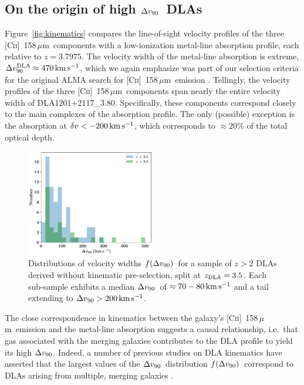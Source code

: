 \documentclass[twocolumn]{aastex62}
\newcommand{\zdla}{3.7975}
\newcommand{\dlaname}{DLA1201+2117\_3.80}
\newcommand{\cplus}{[\ctwo]~158\,$\mu$m}
\newcommand{\mdvninety}{\Delta v_{\rm 90}}
\newcommand{\dvninety}{$\mdvninety$}
\newcommand{\mfdv}{f(\mdvninety)}
\newcommand{\fdv}{$\mfdv$}
\newcommand{\mkms}{\rm km \, s^{-1}}
\newcommand{\ctwo}{C\textsc{ii}}
\begin{document}
\subsection{On the origin of high \dvninety\ DLAs}
\label{sec:high_dv}

Figure~\ref{fig:kinematics} compares the line-of-sight velocity profiles of the three 
\cplus\ components with a low-ionization metal-line absorption profile, each relative 
to $z = \zdla$. The velocity width of the metal-line absorption is extreme, 
$\mdvninety^{\rm DLA} \approx 470 \, \mkms$,  which we again emphasize was part of our selection
criteria for the original ALMA search for \cplus\ emission \citep{neeleman+17}. Tellingly, 
the velocity profiles of the three \cplus\ components span nearly the entire velocity 
width of \dlaname. Specifically, these components correspond closely to the main complexes
of the absorption profile. The only (possible) exception is the absorption at 
$\delta v < -200 \, \mkms$, which corresponds to $\approx 20\%$ of the total optical depth.

\begin{figure}
\centering
\includegraphics[width=0.5\textwidth]{fig_fdv.pdf}
\vspace{-0.3in}
\caption{Distributions of velocity widths \fdv\ for a sample of $z>2$ DLAs derived without 
kinematic pre-selection, split at $z_{\rm DLA} = 3.5$. Each sub-sample exhibits a median 
\dvninety\ of  $\approx 70-80 \, \mkms$ and a tail extending to $\mdvninety > 200 \, \mkms$.
}
\label{fig:fdv}
\end{figure}


The close correspondence in kinematics between the galaxy's \cplus\ emission and the 
metal-line absorption suggests a causal relationship, i.e.\ that gas associated with 
the merging galaxies contributes to the DLA profile to yield its high \dvninety. 
Indeed, a number of previous studies on DLA kinematics have asserted that the largest values of the
\dvninety\ distribution \fdv\ correspond to DLAs arising from multiple, merging galaxies
\citep[e.g.][]{pw97,mps+01,pgp+08,bird+15}.
\end{document}
